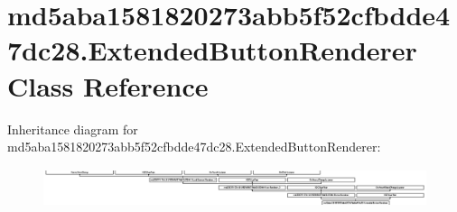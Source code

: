 \hypertarget{classmd5aba1581820273abb5f52cfbdde47dc28_1_1ExtendedButtonRenderer}{}\section{md5aba1581820273abb5f52cfbdde47dc28.\+Extended\+Button\+Renderer Class Reference}
\label{classmd5aba1581820273abb5f52cfbdde47dc28_1_1ExtendedButtonRenderer}
Inheritance diagram for md5aba1581820273abb5f52cfbdde47dc28.\+Extended\+Button\+Renderer\+:\begin{figure}[H]
\begin{center}
\leavevmode
\includegraphics[height=1.143791cm]{classmd5aba1581820273abb5f52cfbdde47dc28_1_1ExtendedButtonRenderer}
\end{center}
\end{figure}
